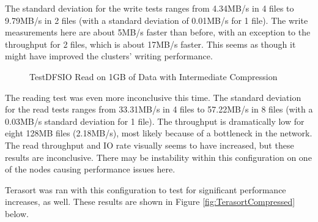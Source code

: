 \documentclass[10pt,journal,compsoc,float]{IEEEtran}
\begin{document}
The standard deviation for the write tests ranges from 4.34MB/s in 4 files to 9.79MB/s in 2 files (with a standard deviation of 0.01MB/s for 1 file). The write measurements here are about 5MB/s faster than before, with an exception to the throughput for 2 files, which is about 17MB/s faster. This seems as though it might have improved the clusters' writing performance.

\readdataCompressed

\begin{figure}[H]
	\centering
	\caption{TestDFSIO Read on 1GB of Data with Intermediate Compression}
	\label{fig:TestDFSIO_read_Compressed}
\end{figure}

The reading test was even more inconclusive this time. The standard deviation for the read tests ranges from 33.31MB/s in 4 files to 57.22MB/s in 8 files (with a 0.03MB/s standard deviation for 1 file). The throughput is dramatically low for eight 128MB files (2.18MB/s), most likely because of a bottleneck in the network. The read throughput and IO rate visually seems to have increased, but these results are inconclusive. There may be instability within this configuration on one of the nodes causing performance issues here.

Terasort was ran with this configuration to test for significant performance increases, as well. These results are shown in Figure \ref{fig:TerasortCompressed} below.

\sortdataCompressed
\end{document}
